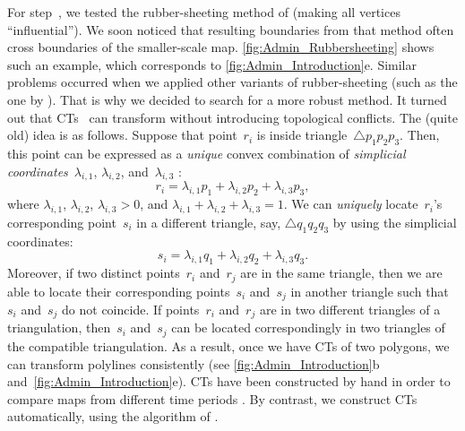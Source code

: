 For step~,
we tested the rubber-sheeting method of \textcite{Doytsher2001} 
(making all vertices ``influential'').  
We soon noticed that resulting boundaries from that method 
often cross boundaries of the smaller-scale map. 
\fig\ref{fig:Admin_Rubbersheeting} shows such an example, 
which corresponds to \fig\ref{fig:Admin_Introduction}e. 
Similar problems occurred 
when we applied other variants of rubber-sheeting
(such as the one by \textcite{Haunert2005Conflation}).
That is why we decided to search for a more robust method.  
It turned out that 
CTs~\parencite{AronovSS93} can 
transform without introducing topological conflicts.  
The (quite old) idea is as follows.  
Suppose that point~$r_i$ is inside triangle~$\triangle{p_1p_2p_3}$. 
Then, this point can be expressed as a
\emph{unique} convex combination of 
\emph{simplicial coordinates}~$\lambda_{i,1}$, 
$\lambda_{i,2}$, and~$\lambda_{i,3}$ 
\parencite{Saalfeld1985-RS}:
\[
r_i=\lambda_{i,1}p_1+\lambda_{i,2}p_2+\lambda_{i,3}p_3,
\]
where $\lambda_{i,1}$, $\lambda_{i,2}$, $\lambda_{i,3}>0$, and
$\lambda_{i,1}+\lambda_{i,2}+\lambda_{i,3}=1$. 
We can \emph{uniquely} locate~$r_i$'s corresponding point~$s_i$ 
in a different triangle, say, $\triangle{q_1q_2q_3}$ 
by using the simplicial coordinates:
\[
s_i=\lambda_{i,1}q_1+\lambda_{i,2}q_2+\lambda_{i,3}q_3.
\]
Moreover, if two distinct points~$r_i$ and~$r_j$ are in the
same triangle, 
then we are able to locate their 
corresponding points~$s_i$ and~$s_j$ in another triangle 
such that~$s_i$ and~$s_j$ do not coincide.
If points~$r_i$ and~$r_j$ are in two different
triangles of a triangulation, 
then~$s_i$ and~$s_j$ can be located correspondingly 
in two triangles of the compatible triangulation. 
As a result, once we have CTs of two 
polygons, we can transform polylines consistently
(see \figs\ref{fig:Admin_Introduction}b 
and~\ref{fig:Admin_Introduction}e). 
CTs have been constructed by hand in order to compare
maps from different time periods \textcite{Fuse2004}. 
By contrast, we construct CTs
automatically, using the algorithm of \textcite{AronovSS93}.


